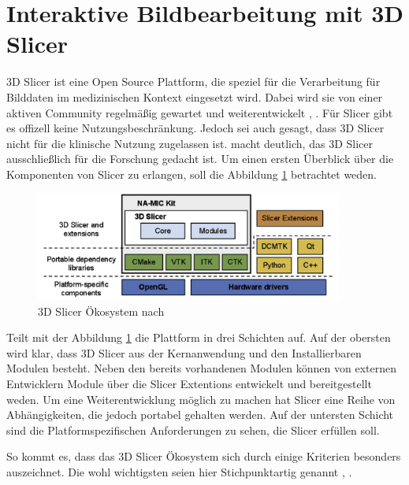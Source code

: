 \pagebreak

\section{Interaktive Bildbearbeitung mit 3D Slicer}
\label{sec:3d_slicer} 3D Slicer ist eine Open Source Plattform, die speziel für die
Verarbeitung für Bilddaten im medizinischen Kontext eingesetzt wird. Dabei wird
sie von einer aktiven Community regelmäßig gewartet und weiterentwickelt \citep[vgl.][]{slicer2024},
\citep[vgl.][]{fedorov2012slicer}. Für Slicer gibt es offizell keine
Nutzungsbeschränkung. Jedoch sei auch gesagt, dass 3D Slicer nicht für die
klinische Nutzung zugelassen ist. \citet{fedorov2012slicer} macht deutlich, das 3D
Slicer ausschließlich für die Forschung gedacht ist. Um einen ersten Überblick
über die Komponenten von Slicer zu erlangen, soll die Abbildung \ref{fig:3d_slicer_oekosystem}
betrachtet weden.

\begin{figure}[h]
	\centering
	\includegraphics[width=0.9\textwidth]{img/3d_slicer_overview.jpg}
	\caption{3D Slicer Ökosystem nach \citet[Seite 1326]{fedorov2012slicer}}
	\label{fig:3d_slicer_oekosystem}
\end{figure}

\citet[Seite 1326]{fedorov2012slicer} Teilt mit der Abbildung
\ref{fig:3d_slicer_oekosystem} die Plattform in drei Schichten auf. Auf der obersten
wird klar, dass 3D Slicer aus der Kernanwendung und den Installierbaren Modulen
besteht. Neben den bereits vorhandenen Modulen können von externen Entwicklern Module
über die Slicer Extentions entwickelt und bereitgestellt weden. Um eine
Weiterentwicklung möglich zu machen hat Slicer eine Reihe von Abhängigkeiten, die
jedoch portabel gehalten werden. Auf der untersten Schicht sind die
Platformspezifischen Anforderungen zu sehen, die Slicer erfüllen soll.

So kommt es, dass das 3D Slicer Ökosystem sich durch einige Kriterien besonders
auszeichnet. Die wohl wichtigsten seien hier Stichpunktartig genannt \citep[vgl.][]{slicer2024},
\citep[vgl.][]{fedorov2012slicer}.

